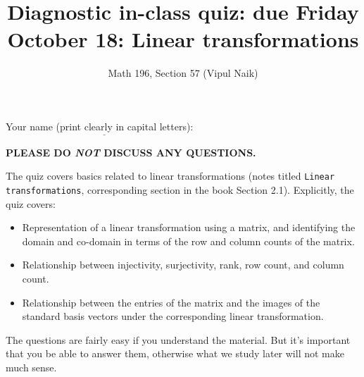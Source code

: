 \documentclass[10pt]{amsart}
\title{Diagnostic in-class quiz: due Friday October 18: Linear transformations}
\author{Math 196, Section 57 (Vipul Naik)}
\begin{document}
\maketitle

Your name (print clearly in capital letters): $\underline{\qquad\qquad\qquad\qquad\qquad\qquad\qquad\qquad\qquad\qquad}$

{\bf PLEASE DO {\em NOT} DISCUSS ANY QUESTIONS.}

The quiz covers basics related to linear transformations (notes titled
{\tt Linear transformations}, corresponding section in the book
Section 2.1). Explicitly, the quiz covers:

\begin{itemize}
\item Representation of a linear transformation using a matrix, and
  identifying the domain and co-domain in terms of the row and column
  counts of the matrix.
\item Relationship between injectivity, surjectivity, rank, row count,
  and column count.
\item Relationship between the entries of the matrix and the images of
  the standard basis vectors under the corresponding linear
  transformation.
\end{itemize}

The questions are fairly easy if you understand the material. But it's
important that you be able to answer them, otherwise what we study
later will not make much sense.
\end{document}
